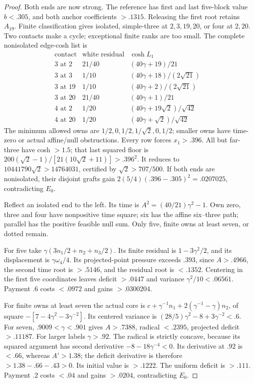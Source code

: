 \documentclass[11pt]{article}
\theoremstyle{definition}
\theoremstyle{remark}
\begin{document}
\begin{proof}
Both ends are now strong. The reference has first and last
five-block value $b<.305$, and both anchor coefficients $>.1315$.
Releasing the first root retains $A_{19}$. Finite classification
gives isolated, simple-three at $2,3,19,20$, or four at $2,20$.
Two contacts make a cycle; exceptional finite ranks are too small.
The complete nonisolated edge-cosh list is
\[
\begin{array}{c|c|c}
\text{contact}&\text{white residual}&\cosh L_1\\\hline
3\text{ at }2&21/40&(40\gamma+19)/21\\
3\text{ at }3&1/10&(40\gamma+18)/(2\sqrt{21})\\
3\text{ at }19&1/10&(40\gamma+2)/(2\sqrt{21})\\
3\text{ at }20&21/40&(40\gamma+1)/21\\
4\text{ at }2&1/20&(40\gamma+19\sqrt2)/\sqrt{42}\\
4\text{ at }20&1/20&(40\gamma+\sqrt2)/\sqrt{42}
\end{array}
\]
The minimum allowed owns are $1/2,0,1/2,1/\sqrt2,0,1/2$;
smaller owns have time-zero or actual affine/null obstructions.
Every row forces $x_1>.396$. All but far-three have cosh $>1.5$;
that last squared floor is
$200(\sqrt2-1)/[21(10\sqrt2+11)]>.396^2$.
It reduces to $10441790\sqrt2>14764031$, certified by
$\sqrt2>707/500$.
If both ends are nonisolated, their disjoint grafts gain
$2(5/4)(.396-.305)^2=.0207025$, contradicting $E_0$.

Reflect an isolated end to the left. Its time is
$A^2=(40/21)\gamma^2-1$.
Own zero, three and four have nonpositive time square; six has
the affine six--three path; parallel has the positive feasible
null sum. Only five, finite owns at least seven, or dotted remain.

For five take $\gamma(3n_1/2+n_2+n_3/2)$.
Its finite residual is $1-3\gamma^2/2$, and its displacement
is $\gamma\omega_4/4$. Its projected-point pressure exceeds
$.393$, since $A>.4966$, the second time root is $>.5146$,
and the residual root is $<.1352$.
Centering in the first five coordinates leaves deficit $>.0447$
and variance $\gamma^2/10<.06561$. Payment $.6$ costs
$<.0972$ and gains $>.0300204$.

For finite owns at least seven the actual core is
$c+\gamma^{-1}n_1+2(\gamma^{-1}-\gamma)n_2$,
of square $-[7-4\gamma^2-3\gamma^{-2}]$.
Its centered variance is $(28/5)\gamma^2-8+3\gamma^{-2}<.6$.
For seven, $.9009<\gamma<.901$ gives $A>.7388$, radical
$<.2395$, projected deficit $>.11187$.
For larger labels $\gamma>.92$. The radical is strictly
concave, because its squared argument has second derivative
$-8-18\gamma^{-4}<0$. Its derivative at $.92$ is $<.66$,
whereas $A'>1.38$; the deficit derivative is therefore
$>1.38-.66-.43>0$. Its initial value is $>.1222$.
The uniform deficit is $>.111$. Payment $.2$ costs $<.04$
and gains $>.0204$, contradicting $E_0$.


\end{proof}
\end{document}
